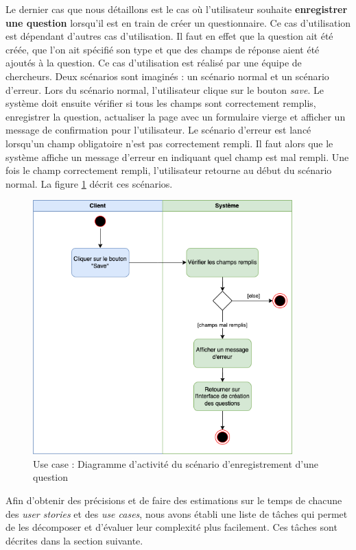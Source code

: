 \documentclass{article}
\begin{document}
Le dernier cas que nous détaillons est le cas où l'utilisateur souhaite \textbf{enregistrer une question} lorsqu'il est en train de créer un questionnaire.
Ce cas d'utilisation est dépendant d'autres cas d'utilisation. Il faut en effet que la question ait été créée, que l'on ait spécifié son type et que des champs de réponse aient    
été ajoutés à la question. Ce cas d'utilisation est réalisé par une équipe de chercheurs.
Deux scénarios sont imaginés : un scénario normal et un scénario d'erreur. Lors du scénario normal, l'utilisateur clique sur le bouton 
\textit{save}. Le système doit ensuite vérifier si tous les champs sont correctement remplis, enregistrer la question, actualiser la page avec un formulaire vierge
et afficher un message de confirmation pour l'utilisateur. Le scénario d'erreur est lancé lorsqu'un champ obligatoire n'est pas correctement
rempli. Il faut alors que le système affiche un message d'erreur en indiquant quel champ est mal rempli. Une fois le champ correctement rempli, l'utilisateur
retourne au début du scénario normal.
La figure \ref{fig:scenario-enregistrer-question} décrit ces scénarios.

\begin{figure}[htp]
    \centering
    \includegraphics[width=10cm]{scenario-enregistrer-question.drawio.png}
    \caption{Use case : Diagramme d'activité du scénario d'enregistrement d'une question}
    \label{fig:scenario-enregistrer-question}
\end{figure}

Afin d'obtenir des précisions et de faire des estimations sur le temps de chacune des \textit{user stories} et des \textit{use cases},
nous avons établi une liste de tâches qui permet de les décomposer et d'évaluer leur complexité plus facilement.
Ces tâches sont décrites dans la section suivante.
\end{document}
